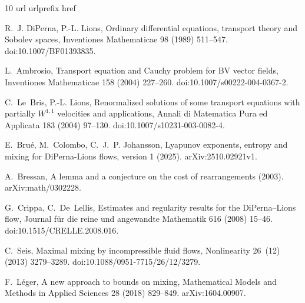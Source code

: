 \documentclass[review,12pt,times,a4paper,nopreprintline]{elsarticle}
\theoremstyle{plain}
\theoremstyle{definition}
\theoremstyle{remark}
\numberwithin{equation}{section}
\begin{document}
\clearpage
\begingroup
{}
\begin{thebibliography}{10}
\expandafter\ifx\csname url\endcsname\relax
  \def\url#1{\texttt{#1}}\fi
\expandafter\ifx\csname urlprefix\endcsname\relax\def\urlprefix{URL }\fi
\expandafter\ifx\csname href\endcsname\relax
  \def\href#1#2{#2} \def\path#1{#1}\fi

R.~J. DiPerna, P.-L. Lions, Ordinary differential equations, transport theory
  and {Sobolev} spaces, Inventiones Mathematicae 98 (1989) 511--547.
\newblock \href {https://doi.org/10.1007/BF01393835}
  {\path{doi:10.1007/BF01393835}}.

L.~Ambrosio, Transport equation and {Cauchy} problem for {BV} vector fields,
  Inventiones Mathematicae 158 (2004) 227--260.
\newblock \href {https://doi.org/10.1007/s00222-004-0367-2}
  {\path{doi:10.1007/s00222-004-0367-2}}.

C.~Le~Bris, P.-L. Lions, Renormalized solutions of some transport equations
  with partially {$W^{1,1}$} velocities and applications, Annali di Matematica
  Pura ed Applicata 183 (2004) 97--130.
\newblock \href {https://doi.org/10.1007/s10231-003-0082-4}
  {\path{doi:10.1007/s10231-003-0082-4}}.

E.~Bru{\'e}, M.~Colombo, C.~J.~P. Johansson, Lyapunov exponents, entropy and
  mixing for {DiPerna-Lions} flows, version 1 (2025).
\newblock \href {https://arxiv.org/abs/2510.02921v1}
  {\path{arXiv:2510.02921v1}}.

A.~Bressan, A lemma and a conjecture on the cost of rearrangements (2003).
\newblock \href {https://arxiv.org/abs/math/0302228}
  {\path{arXiv:math/0302228}}.

G.~Crippa, C.~De~Lellis, Estimates and regularity results for the
  {DiPerna--Lions} flow, Journal f{\"u}r die reine und angewandte Mathematik
  616 (2008) 15--46.
\newblock \href {https://doi.org/10.1515/CRELLE.2008.016}
  {\path{doi:10.1515/CRELLE.2008.016}}.

C.~Seis, Maximal mixing by incompressible fluid flows, Nonlinearity 26~(12)
  (2013) 3279--3289.
\newblock \href {https://doi.org/10.1088/0951-7715/26/12/3279}
  {\path{doi:10.1088/0951-7715/26/12/3279}}.

F.~L{\'e}ger, A new approach to bounds on mixing, Mathematical Models and
  Methods in Applied Sciences 28 (2018) 829--849.
\newblock \href {https://arxiv.org/abs/1604.00907} {\path{arXiv:1604.00907}}.


\end{thebibliography}
\end{document}
